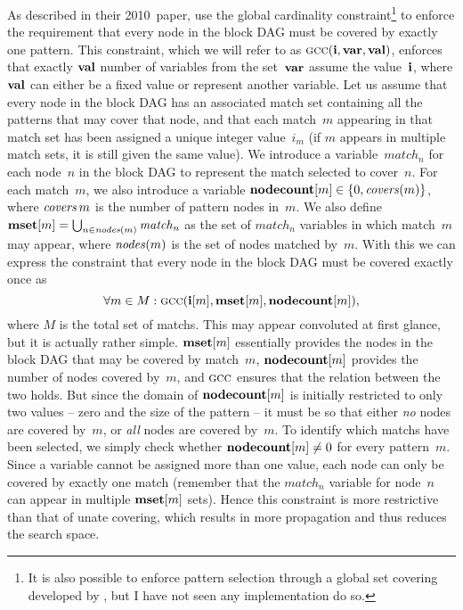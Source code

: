 As described in their 2010~paper, \citeauthor{Floch2010} use the \gls{global
  cardinality constraint}\footnote{It is also possible to enforce \gls{pattern
    selection} through a global set covering developed by
  \textcite{Mouthuy2007}, but I have not seen any implementation do so.} to
enforce the requirement that every \gls{node} in the \gls{block DAG} must be
covered by exactly one \gls{pattern}.
%
%
This \gls{constraint}, which we will refer to as \mbox{$\mGCC(\mVar{i},
  \mVar{var}, \mVar{val})$}, enforces that exactly $\mVar{val}$ number of
\glspl{variable} from the set~$\mVar{var}$ assume the value~$\mVar{i}$, where
$\mVar{val}$ can either be a fixed value or represent another \gls{variable}.
%
Let us assume that
every \gls{node} in the \gls{block DAG} has an associated \gls{match set}
containing all the \glspl{pattern} that may cover that \gls{node}, and that each
\gls{match}~$m$ appearing in that \gls{match set} has been assigned a unique
integer value~$i_m$ (if $m$ appears in multiple \glspl{match set}, it is still
given the same value).
%
We introduce a \gls{variable}~$\mathit{match}_n$
for each \gls{node}~$n$ in the \gls{block DAG} to represent the \gls{match}
selected to cover~$n$.
%
For each \gls{match}~$m$, we also introduce a \gls{variable}
\mbox{$\mVar{nodecount}[m] \in \mSet{0, \mCovers(m)}$}, where
\mbox{$\operatorname{\textrm{\textit{covers}}}{m}$} is the number of \gls{pattern} \glspl{node} in~$m$.
%
We also define \mbox{$\mVar{mset}[m] = \bigcup_{n \in \mFunFont{nodes}(m)}
  \mathit{match}_n$} as the set of $\mathit{match}_n$ variables in which
\gls{match}~$m$ may appear, where $\textrm{\textit{nodes}}(m)$ is the set of
\glspl{node} matched by~$m$.
%
With this we can express the \gls{constraint} that every
\gls{node} in the \gls{block DAG} must be covered exactly once as
%
\begin{displaymath}
  \forall m \in M :
  \mGCC(\mVar{i}[m], \mVar{mset}[m], \mVar{nodecount}[m]),
\end{displaymath}
%
where $M$ is the total set of \glspl{match}.
%
This may appear convoluted at first
glance, but it is actually rather simple.
%
$\mVar{mset}[m]$ essentially provides the \glspl{node} in the \gls{block DAG}
that may be covered by \gls{match}~$m$, $\mVar{nodecount}[m]$ provides the
number of \glspl{node} covered by~$m$, and $\mGCC$ ensures that the relation
between the two holds.
%
But since the domain of $\mVar{nodecount}[m]$ is initially
restricted to only two values -- zero and the size of the \gls{pattern} -- it
must be so that either \emph{no} \glspl{node} are covered by~$m$, or \emph{all}
\glspl{node} are covered by~$m$.
%
To identify which \glspl{match} have been
selected, we simply check whether \mbox{$\mVar{nodecount}[m] \neq 0$} for every
\gls{pattern}~$m$.
%
Since a \gls{variable} cannot be assigned more than
one value, each \gls{node} can only be covered by exactly one \gls{match}
(remember that the $\mathit{match}_n$ variable for \gls{node}~$n$ can appear in
multiple $\mVar{mset}[m]$ sets).
%
Hence this \gls{constraint} is more restrictive than
that of \gls{unate covering}, which results in more propagation and thus reduces
the search space.

